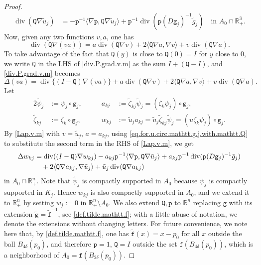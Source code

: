\documentclass[10pt,a4paper]{amsart}
\newcommand{\R}{{\mathbb R}}
\DeclareMathOperator{\divergence}{div}
\newcommand{\grad}{\nabla}
\newcommand{\la}{\langle}
\newcommand{\ra}{\rangle}
\begin{document}
\begin{proof}
\begin{align} 
\divergence (\mathtt Q \grad \tilde u_j) 
& = - \mathtt p^{-1} \la \grad \mathtt p , \mathtt Q \grad \tilde u_j \ra
+ \mathtt p^{-1} \divergence (\mathtt p (D \mathtt g_j)^{-1} \tilde g_j) 
\quad \text{in } A_0 \cap \R^3_+.
\label{eq.for.u.circ.mathtt.g.j.with.mathtt.Q}
\end{align}
Now, given any two functions $v,a$, one has 
\begin{equation} \label{div.P.grad.v.m}
\divergence (\mathtt Q \grad (va)) 
= a \divergence (\mathtt Q \grad v) 
+ 2 \la \mathtt Q \grad a , \grad v \ra 
+ v \divergence (\mathtt Q \grad a).
\end{equation}
To take advantage of the fact that $\mathtt Q(y)$ is close to $\mathtt Q(0) = I$ for $y$ close to $0$, 
we write $\mathtt Q$ in the LHS of \eqref{div.P.grad.v.m} 
as the sum $I + (\mathtt Q - I)$, and \eqref{div.P.grad.v.m} becomes 
\begin{equation} \label{Lap.v.m}
\Delta (va)
= \divergence \{ (I - \mathtt Q) \grad (va) \}
+ a \divergence (\mathtt Q \grad v) 
+ 2 \la \mathtt Q \grad a , \grad v \ra 
+ v \divergence ( \mathtt Q \grad a).
\end{equation}
Let 
\begin{alignat}{2}
\tilde \psi_j & := \psi_j \circ \mathtt g_j, \qquad & 
a_{kj} & := \tilde \zeta_{kj} \tilde \psi_j = (\zeta_k \psi_j) \circ \mathtt g_j, 
\label{def.a.kj}
\\ 
\tilde \zeta_{kj} & := \zeta_k \circ \mathtt g_j, \qquad &  
w_{kj} & := \tilde u_j a_{kj} = \tilde u_j \tilde \zeta_{kj} \tilde \psi_j
= (u \zeta_k \psi_j) \circ \mathtt g_j.
\label{def.w.kj}
\end{alignat} 
By \eqref{Lap.v.m} with $v = \tilde u_j$, $a = a_{kj}$, 
using \eqref{eq.for.u.circ.mathtt.g.j.with.mathtt.Q} 
to substitute the second term in the RHS of \eqref{Lap.v.m}, 
we get 
\begin{align} 
\Delta w_{kj} 
& = \divergence ((I - \mathtt Q) \grad w_{kj} ) 
- a_{kj} \mathtt p^{-1} \la \grad \mathtt p , \mathtt Q \grad \tilde u_j \ra
+ a_{kj} \mathtt p^{-1} \divergence (\mathtt p (D \mathtt g_j)^{-1} \tilde g_j) 
\notag \\ & \quad  
+ 2 \la \mathtt Q \grad a_{kj} , \grad \tilde u_j \ra
+ \tilde u_j \divergence ( \mathtt Q \grad a_{kj} )
\label{eq.Lap.w}
\end{align}
in $A_0 \cap \R^n_+$. 
Note that $\tilde \psi_j$ is compactly supported in $A_0$ 
because $\psi_j$ is compactly supported in $K_j$. 
Hence $w_{kj}$ is also compactly supported in $A_0$, and we 
extend it to $\R^n_+$ by setting $w_j := 0$ in $\R^n_+ \setminus A_0$. 
We also extend $\mathtt Q, \mathtt p$ to $\R^n$ 
replacing $\mathtt g$ with its extension 
$\tilde{\mathtt g} = \tilde{\mathtt f}^{-1}$, see \eqref{def.tilde.mathtt.f};
with a little abuse of notation, we denote the extensions without changing letters.
For future convenience, we note here that, 
by \eqref{def.tilde.mathtt.f}, one has $\tilde{\mathtt f}(x) = x - p_0$ 
for all $x$ outside the ball $B_{4\delta}(p_0)$, 
and therefore $\mathtt p = 1$, $\mathtt Q = I$ 
outside the set $\mathtt f(B_{4\delta}(p_0))$, 
which is a neighborhood of $A_0 = \mathtt f(B_{2\delta}(p_0))$. 


\end{proof}
\end{document}
